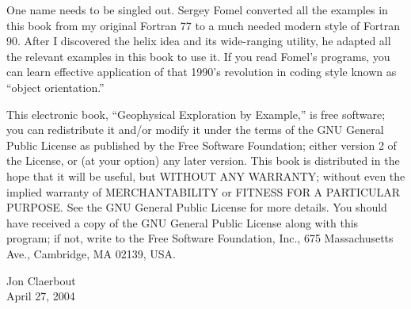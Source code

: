 One name needs to be singled out. Sergey Fomel converted all the
examples in this book from my original Fortran 77 to a much needed
modern style of Fortran 90. After I discovered the helix idea and its
wide-ranging utility, he adapted all the relevant examples in this
book to use it. If you read Fomel's programs, you can learn effective
application of that 1990's revolution in coding style known as
``object orientation.''

{\small This electronic book, ``Geophysical Exploration by Example,''
is free software; you can redistribute it and/or modify it under the
terms of the GNU General Public License as published by the Free
Software Foundation; either version 2 of the License, or (at your
option) any later version. This book is distributed in the hope that
it will be useful, but WITHOUT ANY WARRANTY; without even the implied
warranty of MERCHANTABILITY or FITNESS FOR A PARTICULAR PURPOSE. See
the GNU General Public License for more details. You should have
received a copy of the GNU General Public License along with this
program; if not, write to the Free Software Foundation, Inc., 675
Massachusetts Ave., Cambridge, MA 02139, USA.}

\noindent Jon Claerbout \\
\noindent April 27, 2004
